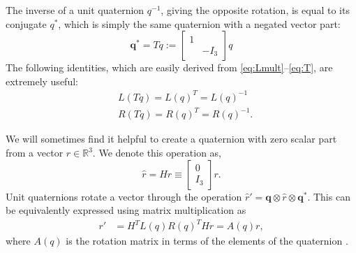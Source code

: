 \documentclass[letterpaper, 10 pt, conference]{ieeeconf}  %
\newcommand{\R}{\mathbb{R}}
\newcommand{\q}{\textbf{q}}
\begin{document}
        The inverse of a unit quaternion $q^{-1}$, giving the opposite rotation, is equal 
        to its conjugate $q^*$, which is simply the same quaternion with a negated vector 
        part:
        \begin{equation} \label{eq:T}
            \q^* = T q := \begin{bmatrix} 
                1 & \\ 
                & -I_3 
            \end{bmatrix} q
        \end{equation}
        The following identities, which are easily derived from
        \eqref{eq:Lmult}--\eqref{eq:T}, are extremely useful:
        \begin{align}
            &L(Tq) = L(q)^T = L(q)^{-1} \\
            &R(Tq) = R(q)^T = R(q)^{-1} .
        \end{align}
        
        We will sometimes find it helpful to create a quaternion with zero scalar part from 
        a vector $r \in \R^3$. We denote this operation as,
        \begin{equation}
            \hat{r} = H r \equiv \begin{bmatrix} 0 \\ I_3 \end{bmatrix} r.
        \end{equation}
        Unit quaternions rotate a vector through the operation 
        $\hat{r}' = \q \otimes \hat{r} \otimes \q^*$. 
        This can be equivalently expressed using matrix multiplication as
        \begin{align} 
            r' &= H^T L(q) R(q)^T H r = A(q)r , \label{eq:quaternion_rotation}
        \end{align}
        where $A(q)$ is the rotation matrix in terms of the elements of the quaternion 
        \cite{kane1983spacecraftdynamics}. 
\end{document}
